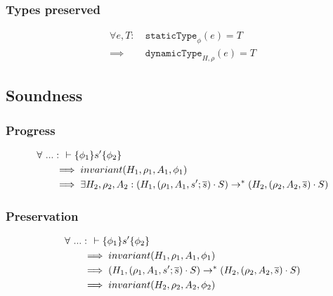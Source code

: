 \documentclass[11pt,a4paper]{article}
\begin{document}
\subsubsection{Types preserved}
\begin{align*}
    \forall e, T :&~ \texttt{staticType}_{\phi}(e) = T \\
    \implies&~ \texttt{dynamicType}_{H, \rho}(e) = T
\end{align*}

\subsection{Soundness}
\subsubsection{Progress}
\begin{align*}
\forall~ ... &:~~ \vdash\{\phi_1\}s'\{\phi_2\} 
\\ &\implies invariant(H_1, \rho_1, A_1, \phi_1)
\\ &\implies \exists H_2, \rho_2, A_2 : (H_1, (\rho_1, A_1, s' ; \overline{s}) \cdot S)
							\rightarrow^* (H_2, (\rho_2, A_2, \overline{s}) \cdot S)
\end{align*}

\subsubsection{Preservation}
\begin{align*}
\forall~ ... &:~~ \vdash\{\phi_1\}s'\{\phi_2\} 
\\ &\implies invariant(H_1, \rho_1, A_1, \phi_1)
\\ &\implies (H_1, (\rho_1, A_1, s' ; \overline{s}) \cdot S)
  \rightarrow^* (H_2, (\rho_2, A_2, \overline{s}) \cdot S)
\\ &\implies invariant(H_2, \rho_2, A_2, \phi_2)
\end{align*}
\end{document}
